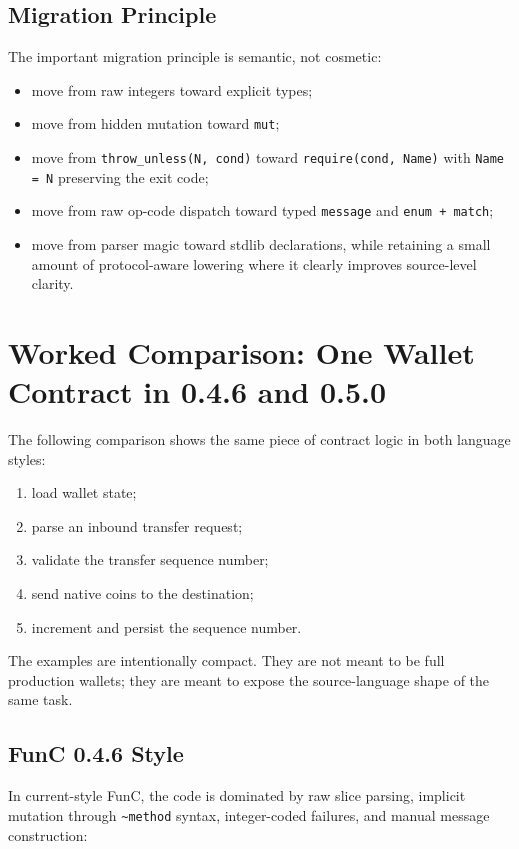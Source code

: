 \documentclass[12pt,oneside]{article}
\begin{document}
\subsection{Migration Principle}
The important migration principle is semantic, not cosmetic:

\begin{itemize}
\item move from raw integers toward explicit types;
\item move from hidden mutation toward \verb|mut|;
\item move from \verb|throw_unless(N, cond)| toward
\verb|require(cond, Name)| with \verb|Name = N| preserving the exit
code;
\item move from raw op-code dispatch toward typed \verb|message| and
\verb|enum + match|;
\item move from parser magic toward stdlib declarations, while
retaining a small amount of protocol-aware lowering where it clearly
improves source-level clarity.
\end{itemize}

\section{Worked Comparison: One Wallet Contract in 0.4.6 and 0.5.0}
The following comparison shows the same piece of contract logic in both
language styles:

\begin{enumerate}
\item load wallet state;
\item parse an inbound transfer request;
\item validate the transfer sequence number;
\item send native coins to the destination;
\item increment and persist the sequence number.
\end{enumerate}

The examples are intentionally compact. They are not meant to be full
production wallets; they are meant to expose the source-language shape of the
same task.

\subsection{FunC 0.4.6 Style}
In current-style FunC, the code is dominated by raw slice parsing, implicit
mutation through \verb|~method| syntax, integer-coded failures, and manual
message construction:
\end{document}
